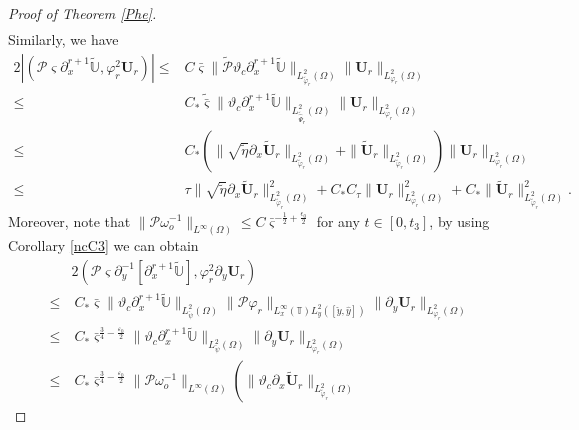 \documentclass{amsart}
\numberwithin{equation}{section}
\begin{document}
\begin{proof}[Proof of Theorem \ref{Phe}]
\begin{align}
\end{align}
Similarly, we have
\begin{align}\label{J722}
2\left|(\mathcal{P}\varsigma\partial_{x}^{r+1}\tilde{\mathbb{U}},\varphi_{r}^{2}\mathbf{U}_{r})\right|
\leq& C\bar{\varsigma}\|\tilde{\mathcal{P}}\vartheta_{c}\partial_{x}^{r+1}\tilde{\mathbb{U}}\|_{L_{\tilde{\varphi}_{r}}^{2}(\Omega)}
             \|\mathbf{U}_{r}\|_{L_{\varphi_{r}}^{2}(\Omega)}\\
\leq& C_{*}\tilde{\bar{\varsigma}}\|\vartheta_{c}\partial_{x}^{r+1}\tilde{\mathbb{U}}\|_{L_{\tilde{\hat{\Psi}}_{r}}^{2}(\Omega)}
                 \|\mathbf{U}_{r}\|_{L_{\varphi_{r}}^{2}(\Omega)}\nonumber\\
\leq& C_{*}\left(\|\sqrt{\tilde{\eta}}\partial_{x}\tilde{\mathbf{U}}_{r}\|_{L_{\tilde{\varphi}_{r}}^{2}(\Omega)}
            +\|\tilde{\mathbf{U}}_{r}\|_{L_{\tilde{\varphi}_{r}}^{2}(\Omega)}\right)
      \|\mathbf{U}_{r}\|_{L_{\varphi_{r}}^{2}(\Omega)}\nonumber\\
\leq& \tau\|\sqrt{\tilde{\eta}}\partial_{x}\tilde{\mathbf{U}}_{r}\|_{L_{\tilde{\varphi}_{r}}^{2}(\Omega)}^{2}
     +C_{*}C_{\tau}\|\mathbf{U}_{r}\|_{L_{\varphi_{r}}^{2}(\Omega)}^{2}
     +C_{*}\|\tilde{\mathbf{U}}_{r}\|_{L_{\tilde{\varphi}_{r}}^{2}(\Omega)}^{2}.\nonumber
\end{align}
Moreover, note that $\|\mathcal{P}\omega_{o}^{-1}\|_{L^{\infty}(\Omega)}\leq C\bar{\varsigma}^{-\frac{1}{2}+\frac{\epsilon_{0}}{2}}$ for any $t\in[0,t_{3}]$, by using Corollary \ref{ncC3} we can obtain
\begin{align}\label{J723}
&2(\mathcal{P}\varsigma\partial_{y}^{-1}[\partial_{x}^{r+1}\tilde{\mathbb{U}}],\varphi_{r}^{2}\partial_{y}\mathbf{U}_{r})\\
\leq&~C_{*}\bar{\varsigma}\|\vartheta_{c}\partial_{x}^{r+1}\tilde{\mathbb{U}}\|_{L_{\check{\psi}}^{2}(\Omega)}
       \|\mathcal{P}\varphi_{r}\|_{L_{x}^{\infty}(\mathbb{T})L_{y}^{2}([\check{y},\hat{y}])}\|\partial_{y}\mathbf{U}_{r}\|_{L_{\varphi_{r}}^{2}(\Omega)}\nonumber\\
\leq&~C_{*}\bar{\varsigma}^{\frac{3}{4}-\frac{\varepsilon_{0}}{2}}\|\vartheta_{c}\partial_{x}^{r+1}\tilde{\mathbb{U}}\|_{L_{\check{\psi}}^{2}(\Omega)}
                               \|\partial_{y}\mathbf{U}_{r}\|_{L_{\varphi_{r}}^{2}(\Omega)}\nonumber\\
\leq&~C_{*}\bar{\varsigma}^{\frac{3}{4}-\frac{\varepsilon_{0}}{2}}\|\mathcal{P}\omega_{o}^{-1}\|_{L^{\infty}(\Omega)}
           \left(\|\vartheta_{c}\partial_{x}\tilde{\mathbf{U}}_{r}\|_{L_{\tilde{\varphi}_{r}}^{2}(\Omega)}

\end{align}
\end{proof}
\end{document}
